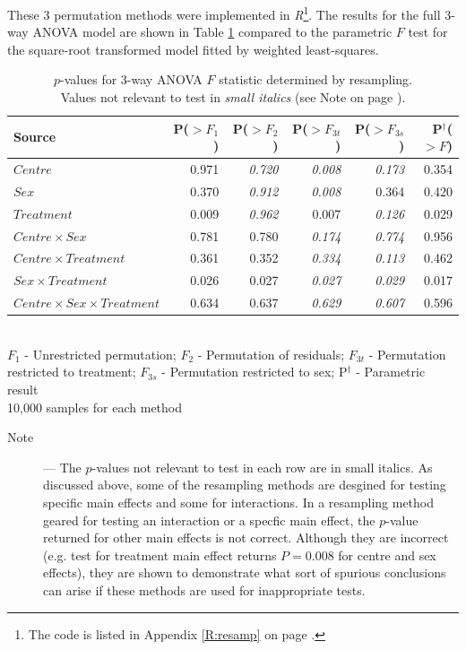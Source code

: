 These 3 permutation methods were implemented in \emph{R}\footnote{The code is listed in Appendix \ref{R:resamp} on page \pageref{R:resamp}.}. The results for the full 3-way ANOVA model are shown in Table \ref{aovresamp} compared to the parametric $F$ test for the square-root transformed model fitted by weighted least-squares.
\begin{table}[h]
\centering
\caption{$p$-values for 3-way ANOVA $F$ statistic determined by resampling.\\Values not relevant to test in \small{\textit{small italics}} (see Note on page \pageref{resampnote}).}\label{aovresamp}
\begin{tabular}{l|rrrr|r}                   
Source						&P($>F_{1}$)&P($>F_{2}$)&P($>F_{3t}$)&P($>F_{3s}$)&P$^{\dag}$($>F$)\\
\hline
$Centre$     					& 0.971 & \small{\textit{0.720}} & \small{\textit{0.008}} & \small{\textit{0.173}} & 0.354 \\    
$Sex$        					& 0.370 & \small{\textit{0.912}} & \small{\textit{0.008}} & 0.364 & 0.420 \\  
$Treatment$  					& 0.009 & \small{\textit{0.962}} & 0.007 			   & \small{\textit{0.126}} & 0.029 \\
$Centre\times Sex$ 				& 0.781 & 0.780 			& \small{\textit{0.174}} & \small{\textit{0.774}} & 0.956 \\
$Centre\times Treatment$ 		& 0.361 & 0.352 			& \small{\textit{0.334}} & \small{\textit{0.113}} & 0.462 \\
$Sex\times Treatment$     		& 0.026 & 0.027 			& \small{\textit{0.027}} & \small{\textit{0.029}} & 0.017 \\
$Centre\times Sex\times Treatment$& 0.634 & 0.637 			& \small{\textit{0.629}} & \small{\textit{0.607}} & 0.596
\end{tabular}\\
$F_{1}$ - Unrestricted permutation; $F_{2}$ - Permutation of residuals; $F_{3t}$ - Permutation restricted to treatment; $F_{3s}$ - Permutation restricted to sex; P$^{\dag}$ - Parametric result\\
10,000 samples for each method
\end{table}
\begin{description}
\item[Note]\label{resampnote} --- The $p$-values not relevant to test in each row are in small italics. As discussed above, some of the resampling methods are desgined for testing specific main effects and some for interactions. In a resampling method geared for testing an interaction or a specfic main effect, the $p$-value returned for other main effects is not correct. Although they are incorrect (e.g. test for treatment main effect returns $P=0.008$ for centre and sex effects), they are shown to demonstrate what sort of spurious conclusions can arise if these methods are used for inappropriate tests.
\end{description}


